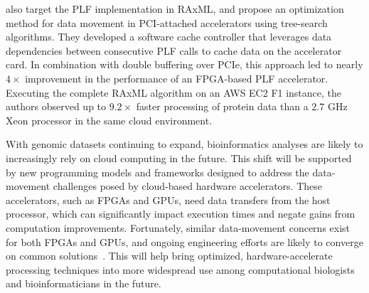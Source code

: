\citet{Alachiotis2021AcceleratingCloud} also target the PLF implementation in RAxML, and propose an optimization method for data movement in PCI-attached accelerators using tree-search algorithms. They developed a software cache controller that leverages data dependencies between consecutive PLF calls to cache data on the accelerator card. In combination with double buffering over PCIe, this approach led to nearly $4\times$ improvement in the performance of an FPGA-based PLF accelerator. Executing the complete RAxML algorithm on an AWS EC2 F1 instance, the authors observed up to $9.2\times$ faster processing of protein data than a $2.7$ GHz Xeon processor in the same cloud environment.

With genomic datasets continuing to expand, bioinformatics analyses are likely to increasingly rely on cloud computing in the future. This shift will be supported by new programming models and frameworks designed to address the data-movement challenges posed by cloud-based hardware accelerators. These accelerators, such as FPGAs and GPUs, need data transfers from the host processor, which can significantly impact execution times and negate gains from computation improvements. Fortunately, similar data-movement concerns exist for both FPGAs and GPUs, and ongoing engineering efforts are likely to converge on common solutions~\cite{Corts2023AGenetics}. This will help bring optimized, hardware-accelerate processing techniques into more widespread use among computational biologists and bioinformaticians in the future.




